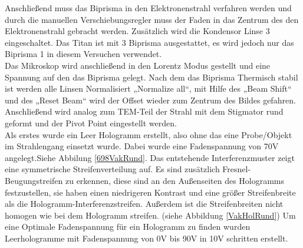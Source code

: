 Anschließend muss das Biprisma in den Elektronenstrahl verfahren werden und durch die manuellen Verschiebungsregler muss der Faden in das Zentrum des den Elektronenstrahl gebracht werden. Zusätzlich wird die Kondensor Linse 3 eingeschaltet. Das Titan ist mit 3 Biprisma ausgestattet, es wird jedoch nur das Biprisma 1 in diesem Versuchen verwendet. \\
Das Mikroskop wird anschließend in den Lorentz Modus gestellt und eine Spannung auf den das Biprisma gelegt. Nach dem das Biprisma Thermisch stabil ist werden alle Linsen Normalisiert „Normalize all“, mit Hilfe des „Beam Shift“ und des „Reset Beam“ wird der Offset wieder zum Zentrum des Bildes gefahren. Anschließend wird analog zum TEM-Teil der Strahl mit dem Stigmator rund geformt und der Pivot Point eingestellt werden. \\
Als erstes wurde ein Leer Hologramm erstellt, also ohne das eine Probe/Objekt im Strahlengang einsetzt wurde. Dabei wurde eine Fadenspannung von 70V angelegt.Siehe Abbilung \cref{698VakRund}. Das entstehende Interferenzmuster zeigt eine symmetrische Streifenverteilung auf. Es sind zusätzlich Fresnel-Beugungstreifen zu erkennen, diese sind an den Außenseiten des Hologramms festzustellen, sie haben einen niedrigeren Kontrast und eine größer Streifenbreite als die Hologramm-Interferenzstreifen. Außerdem ist die Streifenbreiten nicht homogen wie bei dem Hologramm streifen. (siehe Abbildung \cref{VakHolRund})
Um eine Optimale Fadenspannung für ein Hologramm zu finden wurden Leerhologramme mit Fadenspannung von 0V bis 90V in 10V schritten erstellt.

